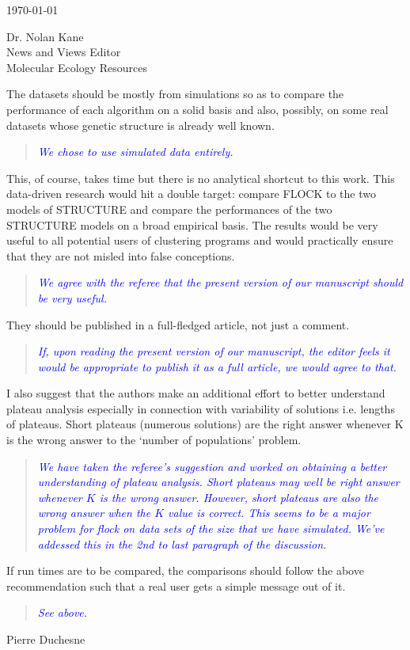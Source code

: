 \documentclass[11pt]{letter}
\newcommand{\reply}[1]{\begin{quotation}\small\sl\textcolor{blue}{#1}\end{quotation}}
\begin{document}
\begin{letter}{ \today 

Dr. Nolan Kane\\
News and Views Editor\\
Molecular Ecology Resources \\
}
The datasets should be mostly
from simulations so as to compare the performance of each algorithm on a solid basis and also, possibly, on some real datasets whose genetic structure is already well known. 

\reply{We chose to use simulated data entirely.}

This, of course, takes time but there is no analytical shortcut to this work. This data-driven research would hit a double target: compare FLOCK to the two models of STRUCTURE and compare the performances of the two STRUCTURE models on a broad empirical basis. The results would be very useful to all potential users of clustering programs and would practically ensure that they are not misled into false conceptions. 

\reply{We agree with the referee that the present version of our manuscript should be very useful.}

They should be published in a full-fledged article, not just a comment. 

\reply{If, upon reading the present version of our manuscript, the editor feels it would be appropriate
to publish it as a full article, we would agree to that.
}


I also suggest that the authors make an additional effort to better understand plateau analysis especially in connection with variability of solutions i.e. lengths of plateaus. Short plateaus (numerous solutions) are the right answer whenever K is the wrong answer to the `number of populations' problem. 

\reply{We have taken the referee's suggestion and worked on obtaining a better understanding of plateau analysis.
Short plateaus may well be right answer whenever $K$ is the wrong answer.  However, short plateaus are also
the wrong answer when the $K$ value is correct.  This seems to be a major problem for {\sc flock} on data sets
of the size that we have simulated.  We've addessed this in the 2nd to last paragraph of the discussion. }

If run times are to be compared, the comparisons should follow the above recommendation such that a real user gets a simple message out of it.

\reply{See above.}
Pierre Duchesne

\end{letter}

 
\end{document}
